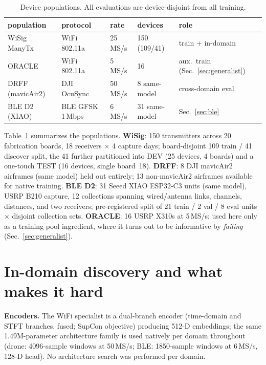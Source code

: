 \documentclass[conference]{IEEEtran}
\begin{document}
\begin{table}[t]
\caption{Device populations. All evaluations are device-disjoint from all training.}
\label{tab:data}
\centering\small
\begin{tabular}{lllll}
\toprule
population & protocol & rate & devices & role \\
\midrule
WiSig ManyTx & WiFi 802.11a & 25\,MS/s & 150 (109/41) & train + in-domain \\
ORACLE & WiFi 802.11a & 5\,MS/s & 16 & aux.\ train (Sec.~\ref{sec:generalist}) \\
DRFF (mavicAir2) & DJI OcuSync & 50\,MS/s & 8 same-model & cross-domain eval \\
BLE D2 (XIAO) & BLE GFSK 1\,Mbps & 6\,MS/s & 31 same-model & Sec.~\ref{sec:ble} \\
\bottomrule
\end{tabular}
\end{table}

Table~\ref{tab:data} summarizes the populations. \textbf{WiSig}: 150 transmitters across 20
fabrication boards, 18 receivers $\times$ 4 capture days; board-disjoint 109 train / 41 discover
split, the 41 further partitioned into DEV (25 devices, 4 boards) and a one-touch TEST (16
devices, single board~18). \textbf{DRFF}: 8 DJI mavicAir2 airframes (same model) held out
entirely; 13 non-mavicAir2 airframes available for native training. \textbf{BLE D2}: 31 Seeed
XIAO ESP32-C3 units (same model), USRP B210 capture, 12 collections spanning wired/antenna links,
channels, distances, and two receivers; pre-registered split of 21 train / 2 val / 8 eval units
$\times$ disjoint collection sets. \textbf{ORACLE}: 16 USRP X310s at 5\,MS/s; used here only as a
training-pool ingredient, where it turns out to be informative by \emph{failing}
(Sec.~\ref{sec:generalist}).

\section{In-domain discovery and what makes it hard}
\label{sec:indomain}

\textbf{Encoders.} The WiFi specialist is a dual-branch encoder (time-domain and STFT branches,
fused; SupCon objective) producing 512-D embeddings; the same 1.49M-parameter architecture family
is used natively per domain throughout (drone: 4096-sample windows at 50\,MS/s; BLE: 1850-sample
windows at 6\,MS/s, 128-D head). No architecture search was performed per domain.
\end{document}
